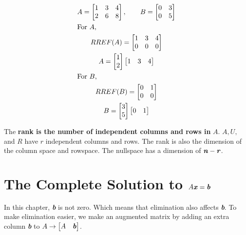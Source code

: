 \documentclass[12pt, letterpaper]{article}
\newcommand{\V}[1]{\textbf{\textit{#1}}}
\begin{document}
	
	\begin{gather*}
	A = \begin{bmatrix}
			1 & 3 & 4 \\
			2 & 6 & 8 
			\end{bmatrix}, \qquad B = \begin{bmatrix}
											0 & 3 \\
											0 & 5
											\end{bmatrix} \\
	\intertext{For $A$,}
		RREF(A) = \begin{bmatrix}
					1 & 3 & 4 \\
					0 & 0 & 0
					\end{bmatrix} \\
		A = \begin{bmatrix} 1\\ 2 \end{bmatrix} \begin{bmatrix} 1 & 3 & 4 \end{bmatrix} \\
	\intertext{For $B$,}
		RREF(B) = \begin{bmatrix}
					0 & 1 \\
					0 & 0
					\end{bmatrix} \\
		B = \begin{bmatrix} 3\\ 5 \end{bmatrix} \begin{bmatrix} 0 & 1 \end{bmatrix}
	\end{gather*}
	
	The \textbf{rank is the number of independent columns and rows in} $A$. $A, U,$ and $R$ have $r$ independent columns and rows. The rank is also the dimension of the column space and rowspace. The nullspace has a dimension of $\V{n} - \V{r}$.
	
	
\section{The Complete Solution to $A\V{x} = \V{b}$}
	In this chapter, \V{b} is not zero. Which means that elimination also affects \V{b}. To make elimination easier, we make an augmented matrix by adding an extra column \V{b} to $A \rightarrow \begin{bmatrix} A & \V{b}\end{bmatrix}$.
	
\end{document}
